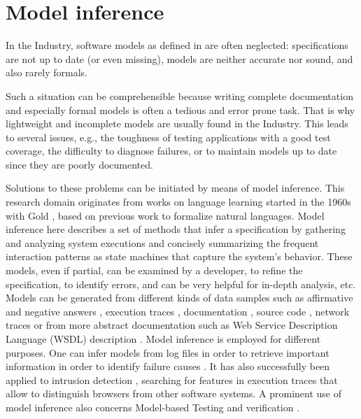 \section{Model inference}
\label{sec:related:modelinf}

In the Industry, software models as defined in
 are
often neglected: specifications are not up to date (or even
missing), models are neither accurate nor sound, and also rarely
formals.

Such a situation can be comprehensible because writing complete
documentation and especially formal models is often a tedious and
error prone task. That is why lightweight and incomplete models
are usually found in the Industry. This leads to several issues,
e.g., the toughness of testing applications with a good test
coverage, the difficulty to diagnose failures, or to maintain
models up to date since they are poorly documented.

Solutions to these problems can be initiated by means of model
inference. This research domain originates from works on language
learning started in the 1960s with Gold \cite{Gold1978302}, based
on previous work to formalize natural languages. Model inference
here describes a set of methods that infer a specification by
gathering and analyzing system executions and concisely
summarizing the frequent interaction patterns as state machines
that capture the system's behavior. These models, even if
partial, can be examined by a developer, to refine the
specification, to identify errors, and can be very helpful for
in-depth analysis, etc. Models can be generated from different
kinds of data samples such as affirmative and negative answers
\cite{Angluin198787}, execution traces
\cite{Krka:2010:UDE:1810295.1810324}, documentation
\cite{ZhongZXM11}, source code
\cite{Salah05scenariographer,Pradel:2009}, network traces
\cite{6079839} or from more abstract documentation such as Web
Service Description Language (WSDL)
description \cite{Bertolino:2009:ASB:1595696.1595719}.  Model
inference is employed for different purposes. One can infer
models from log files in order to retrieve important information
in order to identify failure causes \cite{4700316}. It has also
successfully been applied to intrusion detection \cite{debar00},
searching for features in execution traces that allow to
distinguish browsers from other software systems. A prominent use
of model inference also concerns Model-based Testing
\cite{Lorenzoli2008,tap2011,MobiGUITARIEEESoftware2014} and
verification \cite{Ammons:2002:MS:565816.503275,5416728}.

